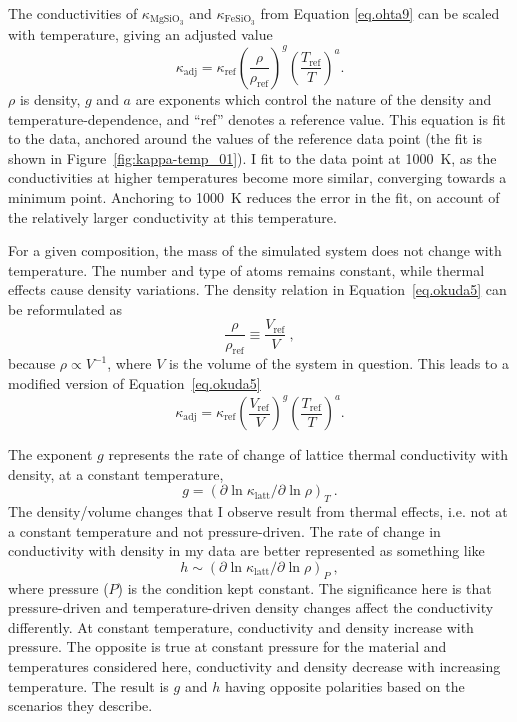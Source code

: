 The conductivities of $\kappa_{\mathrm{MgSiO_{3}}}$ and $\kappa_{\mathrm{FeSiO_{3}}}$ from Equation \ref{eq.ohta9} can be scaled with temperature, giving an adjusted value 
%
\begin{equation}
\kappa_{\mathrm{adj}}=\kappa_{\mathrm{ref}}\left ( \frac{\rho}{\rho_{\mathrm{ref}}} \right )^{g}\left ( \frac{T_{\mathrm{ref}}}{T} \right )^{a}.
\label{eq.okuda5}
\end{equation}
%
$\rho$ is density, $g$ and $a$ are exponents which control the nature of the density and temperature-dependence, and ``ref'' denotes a reference value. This equation is fit to the data, anchored around the values of the reference data point (the fit is shown in Figure~\ref{fig:kappa-temp_01}). I fit to the data point at 1000~K, as the conductivities at higher temperatures become more similar, converging towards a minimum point. Anchoring to 1000~K reduces the error in the fit, on account of the relatively larger conductivity at this temperature.

For a given composition, the mass of the simulated system does not change with temperature. The number and type of atoms remains constant, while thermal effects cause density variations. The density relation in Equation~\ref{eq.okuda5} can be reformulated as
%
\begin{equation}
\frac{\rho }{\rho _{\mathrm{ref}}} \equiv \frac{V_{\mathrm{ref}}}{V} \ ,
\label{eq.rho_to_vol}
\end{equation}
%
because $\rho \propto V^{-1}$, where $V$ is the volume of the system in question. This leads to a modified version of Equation~\ref{eq.okuda5}
%
\begin{equation}
\kappa_{\mathrm{adj}}=\kappa_{\mathrm{ref}}\left ( \frac{V_{\mathrm{ref}}}{V} \right )^{g}\left ( \frac{T_{\mathrm{ref}}}{T} \right )^{a}.
\label{eq.okuda5mod}
\end{equation}

The exponent $g$ represents the rate of change of lattice thermal conductivity with density, at a constant temperature,
%
\begin{equation}
g=\left( \partial \ln \kappa_{\mathrm{latt}} / \partial \ln \rho \right) _{T} \ .
\label{eq.g_def}
\end{equation}
%
The density/volume changes that I observe result from thermal effects, i.e. not at a constant temperature and not pressure-driven. The rate of change in conductivity with density in my data are better represented as something like 
%
\begin{equation}
h \sim \left( \partial \ln \kappa_{\mathrm{latt}} / \partial \ln \rho \right) _{P} \ ,
\label{eq.g_def}
\end{equation}
%
where pressure ($P$) is the condition kept constant. The significance here is that pressure-driven and temperature-driven density changes affect the conductivity differently. At constant temperature, conductivity and density increase with pressure. The opposite is true at constant pressure for the material and temperatures considered here, conductivity and density decrease with increasing temperature. The result is $g$ and $h$ having opposite polarities based on the scenarios they describe.

